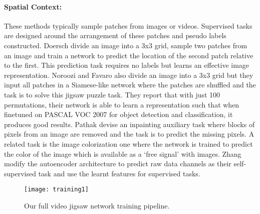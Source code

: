 \documentclass[10pt,twocolumn,letterpaper]{article}
\begin{document}
\paragraph{\textbf{Spatial Context:}} These methods typically sample patches from images or videos. Supervised tasks are designed around the arrangement of these patches and pseudo labels constructed. Doersch \etal \cite{doersch2015unsupervised} divide an image into a 3x3 grid, sample two patches from an image and train a network to predict the location of the second patch relative to the first. This prediction task requires no labels but learns an effective image representation. Noroozi and Favaro \cite{noroozi2016unsupervised} also divide an image into a 3x3 grid but they input all patches in a Siamese-like network where the patches are shuffled and the task is to solve this jigsaw puzzle task. They report that with just 100 permutations, their network is able to learn a representation such that when finetuned on PASCAL VOC 2007 \cite{everingham2015pascal} for object detection and classification, it produces good results. Pathak \etal \cite{pathak2016context} devise an inpainting auxiliary task where blocks of pixels from an image are removed and the task is to predict the missing pixels. A related task is the image colorization one \cite{zhang2016colorful,larsson2016learning} where the network is trained to predict the color of the image which is available as a `free signal' with images. Zhang \etal \cite{zhang2017split} modify the autoencoder architecture to predict raw data channels as their self-supervised task and use the learnt features for supervised tasks. 
\vspace{-3mm}
\begin{figure*}[t]
\centering
\texttt{[image: training1]}
\caption{Our full video jigsaw network training pipeline.}
\label{fig2}
\end{figure*}
\end{document}
